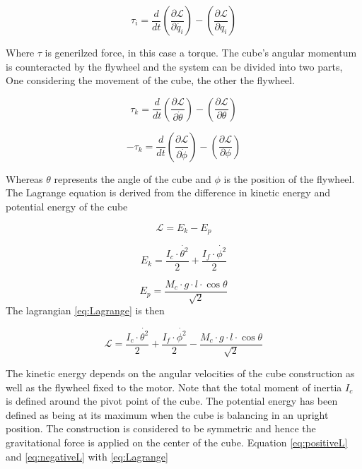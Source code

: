 \documentclass[a4paper,11pt]{kth-mag}
\begin{document}
\begin{equation}
\tau_i=\frac{d}{dt}\left(\frac{\partial \mathcal{L}}{\partial \dot{q_i}}\right)-\left(\frac{\partial \mathcal{L}}{\partial q_i}\right)
\end{equation}

Where $\tau$ is generilzed force, in this case a torque. The cube's angular momentum is counteracted by the flywheel and the system can be divided into two parts, One considering the movement of the cube, the other the flywheel.

\begin{equation} \label{eq:positiveL}
\tau_k=\frac{d}{dt}\left(\frac{\partial \mathcal{L}}{\partial \dot{\theta}}\right)-\left(\frac{\partial \mathcal{L}}{\partial \theta}\right)
\end{equation}

\begin{equation} \label{eq:negativeL}
-\tau_k=\frac{d}{dt}\left(\frac{\partial \mathcal{L}}{\partial \dot{\phi}}\right)-\left(\frac{\partial \mathcal{L}}{\partial \phi}\right)
\end{equation}

Whereas $\theta$ represents the angle of the cube and $\phi$ is the position of the flywheel. \\
The Lagrange equation is derived from the difference in kinetic energy and potential energy of the cube

\begin{equation} \label{eq:Lagrange}
\mathcal{L} = E_k - E_p
\end{equation}

\begin{equation} \label{eq:kinetic energy}
E_k = \frac{I_c \cdot \dot{\theta^2}}{2} + \frac{I_f \cdot \dot{\phi^2} }{2}
\end{equation}

\begin{equation} \label{eq:potential energy}
E_p = \frac{M_c \cdot g \cdot l \cdot \cos \theta}{\sqrt{2}}
\end{equation}
The lagrangian \eqref{eq:Lagrange} is then

\begin{equation}
\mathcal{L} = \frac{I_c \cdot \dot{\theta^2}}{2} + \frac{I_f \cdot \dot{\phi^2} }{2} - \frac{M_c \cdot g \cdot l \cdot \cos \theta}{\sqrt{2}} 
\end{equation}

The kinetic energy depends on the angular velocities of the cube construction as well as the flywheel fixed to the motor. Note that the total moment of inertia $I_c$ is defined around the pivot point of the cube. The potential energy has been defined as being at its maximum when the cube is balancing in an upright position. The construction is considered to be symmetric and hence the gravitational force is applied on the center of the cube.
Equation \eqref{eq:positiveL} and \eqref{eq:negativeL} with \eqref{eq:Lagrange}
\end{document}
